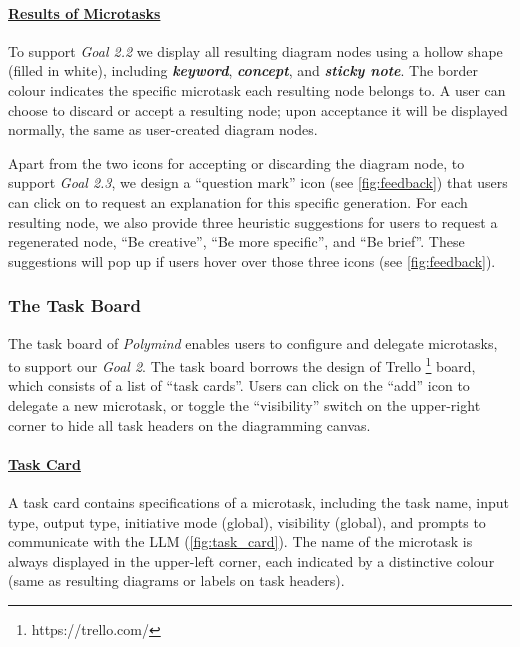 

\paragraph{\underline{Results of Microtasks}} To support \textit{Goal 2.2} we display all resulting diagram nodes using a hollow shape (filled in white), including \textbf{\textcolor{keyword}{\textit{keyword}}}, \textbf{\textcolor{concept}{\textit{concept}}}, and \textbf{\textcolor{sticky_note}{\textit{sticky note}}}. The border colour indicates the specific microtask each resulting node belongs to. A user can choose to discard or accept a resulting node; upon acceptance it will be displayed normally, the same as user-created diagram nodes.

Apart from the two icons for accepting or discarding the diagram node, to support \textit{Goal 2.3}, we design a ``question mark'' icon (see \autoref{fig:feedback}) that users can click on to request an explanation for this specific generation. For each resulting node, we also provide three heuristic suggestions for users to request a regenerated node, ``Be creative'', ``Be more specific'', and ``Be brief''. These suggestions will pop up if users hover over those three icons (see \autoref{fig:feedback}).

\subsubsection{The Task Board}
The task board of \textit{Polymind} enables users to configure and delegate microtasks, to support our \textit{Goal 2}. The task board borrows the design of Trello \footnote{https://trello.com/} board, which consists of a list of ``task cards''. Users can click on the ``add'' icon to delegate a new microtask, or toggle the ``visibility'' switch on the upper-right corner to hide all task headers on the diagramming canvas.

\paragraph{\underline{Task Card}}
A task card contains specifications of a microtask, including the task name, input type, output type, initiative mode (global), visibility (global), and prompts to communicate with the LLM (\autoref{fig:task_card}). The name of the microtask is always displayed in the upper-left corner, each indicated by a distinctive colour (same as resulting diagrams or labels on task headers).


